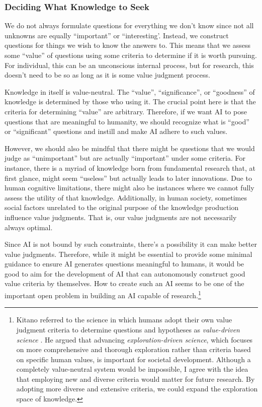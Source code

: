 \subsubsection{Deciding What Knowledge to Seek}
\label{section-deciding-what-knowledge-to-seek}
We do not always formulate questions for everything we don't know since not all unknowns are equally ``important'' or ``interesting'. Instead, we construct questions for things we wish to know the answers to. This means that we assess some ``value'' of questions using some criteria to determine if it is worth pursuing. For individual, this can be an unconscious internal process, but for research, this doesn't need to be so as long as it is some value judgment process.

Knowledge in itself is value-neutral. The ``value'', ``significance'', or ``goodness'' of knowledge is determined by those who using it. The crucial point here is that the criteria for determining ``value'' are arbitrary. Therefore, if we want AI to pose questions that are meaningful to humanity, we should recognize what is ``good'' or ``significant'' questions and instill and make AI adhere to such values. 

However, we should also be mindful that there might be questions that we would judge as ``unimportant'' but are actually ``important'' under some criteria. For instance, there is a myriad of knowledge born from fundamental research that, at first glance, might seem ``useless'' but actually leads to later innovations. Due to human cognitive limitations, there might also be instances where we cannot fully assess the utility of that knowledge. Additionally, in human society, sometimes social factors unrelated to the original purpose of the knowledge production influence value judgments. That is, our value judgments are not necessarily always optimal.

Since AI is not bound by such constraints, there's a possibility it can make better value judgments. Therefore, while it might be essential to provide some minimal guidance to ensure AI generates questions meaningful to humans, it would be good to aim for the development of AI that can autonomously construct good value criteria by themselves. How to create such an AI seems to be one of the important open problem in building an AI capable of research.\footnote{
Kitano referred to the science in which humans adopt their own value judgment criteria to determine questions and hypotheses as \textit{value-driven science} \cite{kitano2021nobel}. He argued that advancing \textit{exploration-driven science}, which focuses on more comprehensive and thorough exploration rather than criteria based on specific human values, is important for societal development. Although a completely value-neutral system would be impossible, I agree with the idea that employing new and diverse criteria would matter for future research. By adopting more diverse and extensive criteria, we could expand the exploration space of knowledge.
} 

